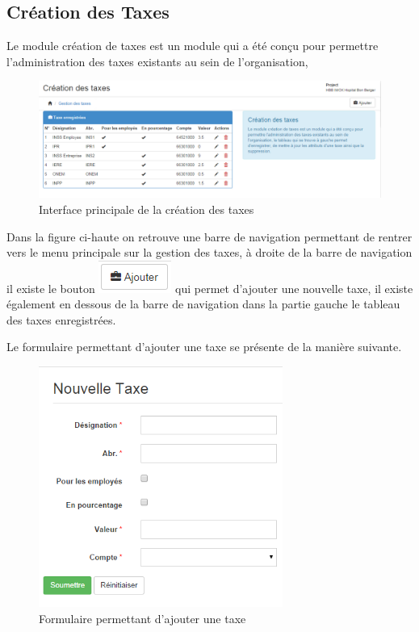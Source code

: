 \documentclass[12pt,a4paper]{report}
\begin{document}
\subsection{Création des Taxes}
Le module création de taxes est un module qui a été conçu pour permettre l'administration des taxes existants au sein de l'organisation,
\begin{figure}[h]
\begin{center}
\includegraphics[width=14cm]{pic/GesCreaTaxes.png}
\end{center}
\caption{Interface principale de la création des taxes}
\label{Interface principale de la création des taxes}
\end{figure}

Dans la figure ci-haute on retrouve une barre de navigation permettant de rentrer vers le menu principale sur la gestion des taxes, à droite de la barre de navigation il existe le bouton \includegraphics[scale=1]{pic/AddTaxe.png} qui permet d'ajouter une nouvelle taxe, il existe également en dessous de la barre de navigation dans la partie gauche le tableau des taxes enregistrées.

Le formulaire permettant d'ajouter une taxe se présente de la manière suivante. 

\begin{figure}[h]
\begin{center}
\includegraphics[width=8cm]{pic/NouvTaxe.png}
\end{center}
\caption{Formulaire permettant d'ajouter une taxe}
\label{Formulaire permettant d'ajouter une taxe}
\end{figure} 
\end{document}
